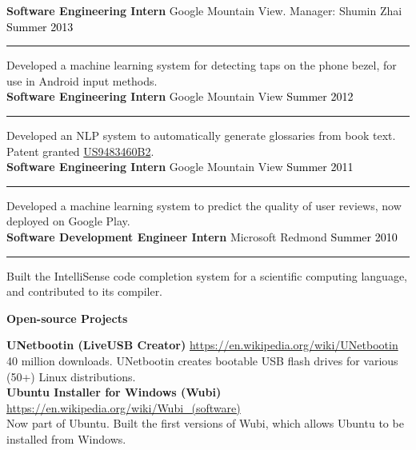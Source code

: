 \documentclass[10pt,A4]{article}
\newcommand{\cvsection}[1]
{
	\begin{center}
		\large\textcolor{sectcol}{\textbf{#1}}
	\end{center}
}
\newcommand{\cvevtone}[4]
{

	\textbf{#2} \hspace{1mm} \textcolor{bgcol}{#3} \hfill \vspace{2.5pt}\textcolor{black}{#1}

\vspace{-8pt}
\textcolor{softcol}{\hrule}
\vspace{6pt}

  #4\\[3pt]

}
\begin{document}
\cvevtone{Summer 2013}{Software Engineering Intern}{\textcolor{sectcol}{Google} \hspace{1mm} Mountain View. Manager: Shumin Zhai}{Developed a machine learning system for detecting taps on the phone bezel, for use in Android input methods.}

\cvevtone{Summer 2012}{Software Engineering Intern}{\textcolor{sectcol}{Google} \hspace{1mm} Mountain View}{Developed an NLP system to automatically generate glossaries from book text. Patent granted \href{https://patents.google.com/patent/US9483460B2}{US9483460B2}.}

\cvevtone{Summer 2011}{Software Engineering Intern}{\textcolor{sectcol}{Google} \hspace{1mm} Mountain View}{Developed a machine learning system to predict the quality of user reviews, now deployed on Google Play.}

\cvevtone{Summer 2010}{Software Development Engineer Intern}{\textcolor{sectcol}{Microsoft} \hspace{1mm} Redmond}{Built the IntelliSense code completion system for a scientific computing language, and contributed to its compiler.}


\cvsection{Open-source Projects}

\textbf{UNetbootin (LiveUSB Creator)} \hfill \url{https://en.wikipedia.org/wiki/UNetbootin}\\ %
\textcolor{sectcol}{40 million downloads.} UNetbootin creates bootable USB flash drives for various (50+) Linux distributions.\\ %

\textbf{Ubuntu Installer for Windows (Wubi)} \hfill \url{https://en.wikipedia.org/wiki/Wubi_(software)}\\ %
\textcolor{sectcol}{Now part of Ubuntu.} Built the first versions of Wubi, which allows Ubuntu to be installed from Windows.\\ %
\end{document}
